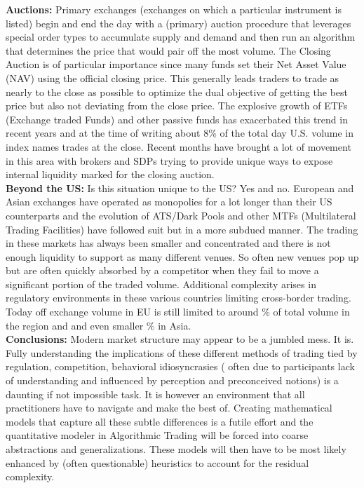 \noindent\textbf{Auctions:} Primary exchanges (exchanges on which a particular instrument is listed) begin and end the day with a (primary) auction procedure that leverages special order types to accumulate supply and demand and then run an algorithm that determines the price that would pair off the most volume. The Closing Auction is of particular importance since many funds set their Net Asset Value (NAV) using the official closing price. This generally leads traders to trade as nearly to the close as possible to optimize the dual objective of getting the best price but also not deviating from the close price. The explosive growth of ETFs (Exchange traded Funds) and other passive funds has exacerbated this trend in recent years and at the time of writing about 8\% of the total day U.S. volume in index names trades at the close. Recent months have brought a lot of movement in this area with brokers and SDPs trying to provide unique ways to expose internal liquidity marked for the closing auction. \\
 
 
\noindent\textbf{Beyond the US:} Is this situation unique to the US? Yes and no. European and Asian exchanges have operated as monopolies for a lot longer than their US counterparts and the evolution of ATS/Dark Pools and other MTFs (Multilateral Trading Facilities) have followed suit but in a more subdued manner. The trading in these markets has always been smaller and concentrated and there is not enough liquidity to support as many different venues. So often new venues pop up but are often quickly absorbed by a competitor when they fail to move a significant portion of the traded volume. Additional complexity arises in regulatory environments in these various countries limiting cross-border trading. Today off exchange volume in EU is still limited to around  \%  of total volume in the region and  and even smaller \% in Asia. \\


\noindent\textbf{Conclusions:} Modern market structure may appear to be a jumbled mess. It is. Fully understanding the implications of these different methods of trading tied by regulation, competition, behavioral idiosyncrasies ( often due to participants lack of understanding and influenced by perception and preconceived notions)  is a daunting if not impossible task. It is however an environment that all practitioners have to navigate and make the best of. Creating mathematical models that capture all these subtle differences is a futile effort and the quantitative modeler in Algorithmic Trading will be forced into coarse abstractions and generalizations. These models will then have to be most likely enhanced by (often questionable) heuristics to account for the residual complexity. 

